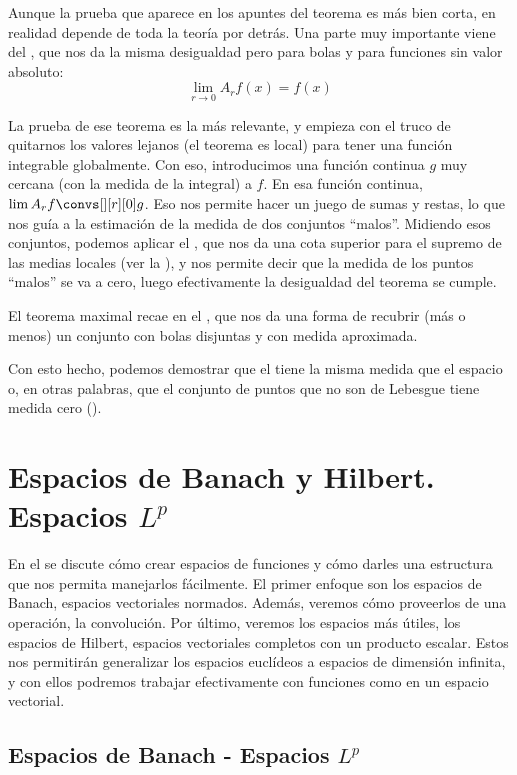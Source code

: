Aunque la prueba que aparece en los apuntes del teorema es más bien corta, en realidad depende de toda la teoría por detrás. Una parte muy importante viene del , que nos da la misma desigualdad pero para bolas y para funciones sin valor absoluto:
\[ \lim_{r\to 0} A_r f(x) = f(x) \]

La prueba de ese teorema es la más relevante, y empieza con el truco de quitarnos los valores lejanos (el teorema es local) para tener una función integrable globalmente. Con eso, introducimos una función continua $g$ muy cercana (con la medida de la integral) a $f$. En esa función continua, $\lim A_r f \convs[][r][0] g$. Eso nos permite hacer un juego de sumas y restas, lo que nos guía a la estimación de la medida de dos conjuntos ``malos''. Midiendo esos conjuntos, podemos aplicar el , que nos da una cota superior para el supremo de las medias locales (ver la ), y nos permite decir que la medida de los puntos ``malos'' se va a cero, luego efectivamente la desigualdad del teorema se cumple.

El teorema maximal recae en el , que nos da una forma de recubrir (más o menos) un conjunto con bolas disjuntas y con medida aproximada.

Con esto hecho, podemos demostrar que el  tiene la misma medida que el espacio o, en otras palabras, que el conjunto de puntos que no son de Lebesgue tiene medida cero ().

\section{Espacios de Banach y Hilbert. Espacios $L^p$}

En el  se discute cómo crear espacios de funciones y cómo darles una estructura que nos permita manejarlos fácilmente. El primer enfoque son los espacios de Banach, espacios vectoriales normados. Además, veremos cómo proveerlos de una operación, la convolución. Por último, veremos los espacios más útiles, los espacios de Hilbert, espacios vectoriales completos con un producto escalar. Estos nos permitirán generalizar los espacios euclídeos a espacios de dimensión infinita, y con ellos podremos trabajar efectivamente con funciones como en un espacio vectorial.

\subsection{Espacios de Banach - Espacios $L^p$}

